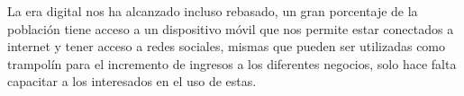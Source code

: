 \documentclass[12pt]{difu100cia} %
\begin{document}
La era digital nos ha alcanzado incluso rebasado, un gran porcentaje de la población tiene acceso a un dispositivo móvil que nos permite estar conectados a internet y tener acceso a redes sociales, mismas que pueden ser utilizadas como trampolín para el incremento de ingresos a los diferentes negocios, solo hace falta capacitar a los interesados en el uso de estas.




\printbibliography

\end{document}
